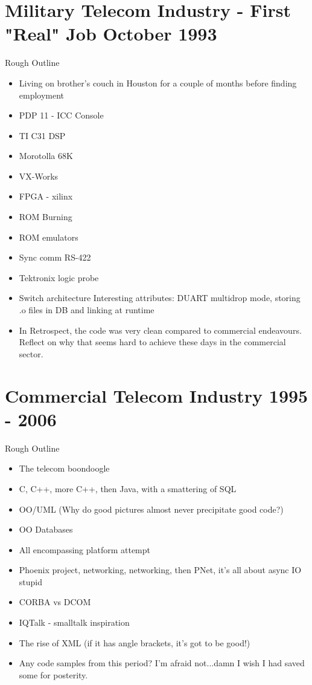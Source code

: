 \documentclass[12pt]{report}
\begin{document}
\section{Military Telecom Industry - First "Real" Job October 1993}
	Rough Outline
	\begin{itemize}
	\item Living on brother's couch in Houston for a couple of
          months before finding employment

	\item PDP 11 - ICC Console
	\item TI C31 DSP
	\item Morotolla 68K
	\item VX-Works
	\item FPGA - xilinx
	\item ROM Burning
	\item ROM emulators
	\item Sync comm RS-422
	\item Tektronix logic probe
	\item Switch architecture Interesting attributes: DUART
          multidrop mode, storing .o files in DB and linking at
          runtime
          \item In Retrospect, the code was very clean compared
            to commercial endeavours. Reflect on why that seems hard
            to achieve these days in the commercial sector.
	\end{itemize}

\section{Commercial Telecom Industry 1995 - 2006}
	Rough Outline
	\begin{itemize}
	\item The telecom boondoogle
	\item C, C++, more C++, then Java, with a smattering of SQL
	\item OO/UML (Why do good pictures almost never precipitate
          good code?)
        \item OO Databases
	\item All encompassing platform attempt
	\item Phoenix project, networking, networking, then PNet, it's all about async IO stupid
	\item CORBA vs DCOM
	\item IQTalk - smalltalk inspiration
	\item The rise of XML (if it has angle brackets, it's got to be good!)
	\item Any code samples from this period? 
          I'm afraid not...damn I wish I had saved some for posterity.
	\end{itemize}
\end{document}
